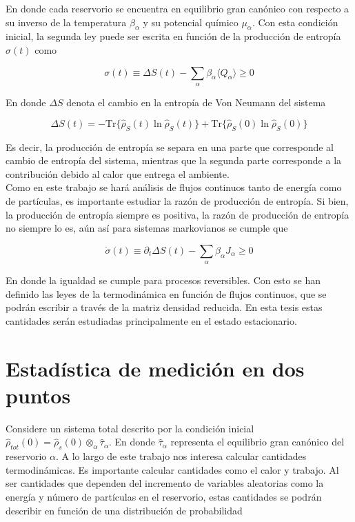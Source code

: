 En donde cada reservorio se encuentra en equilibrio gran canónico con respecto a su inverso de la temperatura $\beta_{\alpha}$ y su potencial químico $\mu_{\alpha}$. Con esta condición inicial, la segunda ley puede ser escrita en función de la producción de entropía $\sigma(t)$ como \cite{esposito2010entropy}

\begin{equation*}
    \sigma(t) \equiv \Delta S(t) - \sum_{\alpha}\beta_{\alpha}\langle Q_{\alpha}\rangle \geq 0
\end{equation*}

En donde $\Delta S$ denota el cambio en la entropía de Von Neumann del sistema

\begin{equation*}
    \Delta S(t) = -  \text{Tr}\{\hat{\rho}_{S}(t)\ln \hat{\rho}_{S}(t) \} +  \text{Tr}\{ \hat{\rho}_{S}(0)\ln \hat{\rho}_{S}(0) \}
\end{equation*}

Es decir, la producción de entropía se separa en una parte que corresponde al cambio de entropía del sistema, mientras que la segunda parte corresponde a la contribución debido al calor que entrega el ambiente.\\
Como en este trabajo se hará análisis de flujos continuos tanto de energía como de partículas, es importante estudiar la razón de producción de entropía. Si bien, la producción de entropía siempre es positiva, la razón de producción de entropía no siempre lo es, aún así para sistemas markovianos se cumple que \cite{strasberg2019non}

\begin{equation*}
    \dot{\sigma}(t) \equiv \partial_{t}\Delta S(t) - \sum_{\alpha}\beta_{\alpha}J_{\alpha} \geq 0
\end{equation*}

En donde la igualdad se cumple para procesos reversibles. Con esto se han definido las leyes de la termodinámica en función de flujos continuos, que se podrán escribir a través de la matriz densidad reducida. En esta tesis estas cantidades serán estudiadas principalmente en el estado estacionario.

\label{sec3sub:leyestermo}

\section{Estadística de medición en dos puntos}
Considere un sistema total descrito por la condición inicial $\hat{\rho}_{tot}(0) = \hat{\rho}_{s}(0) \otimes_{\alpha} \hat{\tau}_{\alpha}$. En donde $\hat{\tau}_{\alpha}$ representa el equilibrio gran canónico del reservorio $\alpha$. A lo largo de este trabajo nos interesa calcular cantidades termodinámicas. Es importante calcular cantidades como el calor y trabajo. Al ser cantidades que dependen del incremento de variables aleatorias como la energía y número de partículas en el reservorio, estas cantidades se podrán describir en función de una distribución de probabilidad

